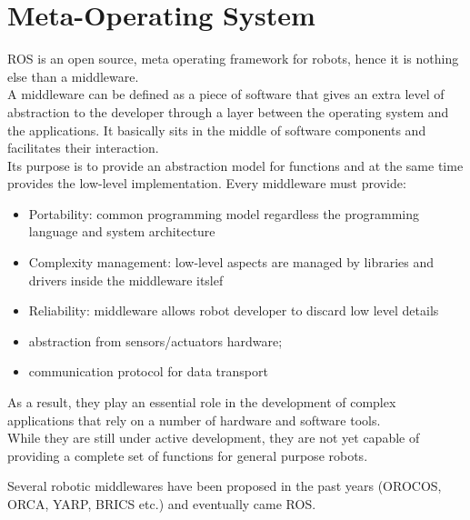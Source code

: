 \section{Meta-Operating System}
ROS is an open source, meta operating framework for robots, hence it is nothing else than a middleware. \\
A middleware can be defined as a piece of software that gives an extra level of abstraction to the developer through a layer between the operating system and the applications.
It basically sits in the middle of software components and facilitates their interaction. \\
Its purpose is to provide an abstraction model for functions and at the same time provides the low-level implementation.
Every middleware must provide:
\begin{itemize}
    \item Portability: common programming model regardless the programming language and system architecture
    \item Complexity management: low-level aspects are managed by libraries and drivers inside the middleware itslef
    \item Reliability: middleware allows robot developer to discard low level details
    \item abstraction from sensors/actuators hardware;
    \item communication protocol for data transport
\end{itemize}
 As a result, they play an essential role in the development of complex applications that rely on a number of hardware and software tools.\\
 While they are still under active development, they are not yet capable of providing a complete set of functions for general purpose robots.
 
 
 
 Several robotic middlewares have been proposed in the past years (OROCOS, ORCA, YARP, BRICS etc.) and eventually came ROS.
 

